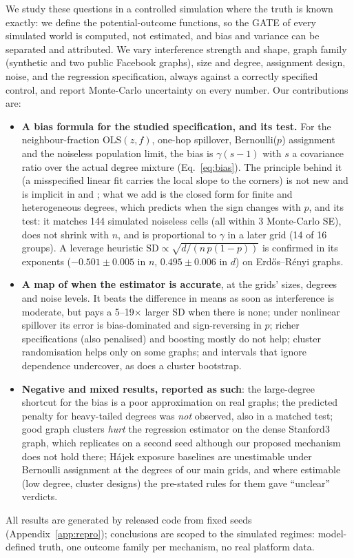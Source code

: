 We study these questions in a controlled simulation where the truth is known exactly: we define the potential-outcome functions, so the GATE of every simulated world is computed,
not estimated, and bias and variance can be separated and attributed. We vary interference strength and shape, graph family (synthetic and two
public Facebook graphs), size and degree, assignment design, noise, and the regression specification, always against a correctly specified control, and report
Monte-Carlo uncertainty on every number. Our contributions are:
\begin{itemize}\setlength\itemsep{0pt}
\item \textbf{A bias formula for the studied specification, and its test.} For the neighbour-fraction OLS$(z,f)$, one-hop spillover, Bernoulli($p$) assignment and the noiseless population limit, the bias is $\gamma(s-1)$ with $s$ a covariance ratio over the actual degree mixture (Eq.~\ref{eq:bias}). The principle behind it (a misspecified linear fit carries the local slope to the corners) is not new and is implicit in \citet{chin2019} and \citet{hanugander2023}; what we add is the closed form for finite and heterogeneous degrees, which predicts when the sign changes with $p$, and its test: it matches 144 simulated noiseless cells (all within 3 Monte-Carlo SE), does not shrink with $n$, and is proportional to $\gamma$ in a later grid (14 of 16 groups). A leverage heuristic $\mathrm{SD}\propto\sqrt{d/(n\,p(1-p))}$ is confirmed in its exponents ($-0.501\pm0.005$ in $n$, $0.495\pm0.006$ in $d$) on Erd\H{o}s--R\'enyi graphs.
\item \textbf{A map of when the estimator is accurate}, at the grids' sizes, degrees and noise levels. It beats the difference in means as soon as interference is moderate, but pays a 5--19$\times$ larger SD when there is none;
under nonlinear spillover its error is bias-dominated and sign-reversing in $p$; richer specifications (also penalised) and boosting mostly do not help; cluster
randomisation helps only on some graphs; and intervals that ignore dependence undercover, as does a cluster bootstrap.
\item \textbf{Negative and mixed results, reported as such}: the large-degree shortcut for the bias is a poor approximation on real graphs; the predicted penalty for heavy-tailed degrees was \emph{not} observed, also in a matched test; good graph clusters \emph{hurt} the regression estimator on the dense Stanford3 graph, which replicates on a second seed although our proposed mechanism does not hold there; Hájek exposure baselines are unestimable under Bernoulli assignment at the degrees of our main grids, and where estimable (low degree, cluster designs) the pre-stated rules for them gave ``unclear'' verdicts.
\end{itemize}
All results are generated by released code from fixed seeds (Appendix~\ref{app:repro}); conclusions are scoped to the simulated regimes: model-defined truth, one outcome family per mechanism, no real platform data.

